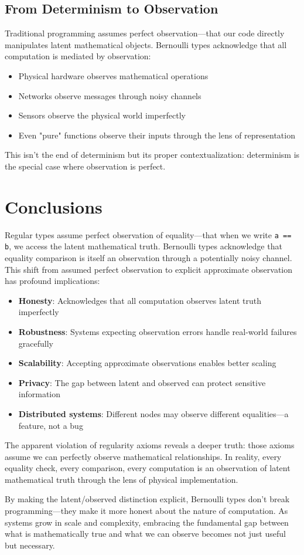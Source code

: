 \documentclass[11pt,final,hidelinks]{article}
\newcommand{\code}[1]{\texttt{#1}}
\begin{document}
\subsection{From Determinism to Observation}

Traditional programming assumes perfect observation—that our code directly manipulates latent mathematical objects. Bernoulli types acknowledge that all computation is mediated by observation:
\begin{itemize}
    \item Physical hardware observes mathematical operations
    \item Networks observe messages through noisy channels  
    \item Sensors observe the physical world imperfectly
    \item Even "pure" functions observe their inputs through the lens of representation
\end{itemize}

This isn't the end of determinism but its proper contextualization: determinism is the special case where observation is perfect.

\section{Conclusions}

Regular types assume perfect observation of equality—that when we write \code{a == b}, we access the latent mathematical truth. Bernoulli types acknowledge that equality comparison is itself an observation through a potentially noisy channel. This shift from assumed perfect observation to explicit approximate observation has profound implications:

\begin{itemize}
    \item \textbf{Honesty}: Acknowledges that all computation observes latent truth imperfectly
    \item \textbf{Robustness}: Systems expecting observation errors handle real-world failures gracefully
    \item \textbf{Scalability}: Accepting approximate observations enables better scaling
    \item \textbf{Privacy}: The gap between latent and observed can protect sensitive information
    \item \textbf{Distributed systems}: Different nodes may observe different equalities—a feature, not a bug
\end{itemize}

The apparent violation of regularity axioms reveals a deeper truth: those axioms assume we can perfectly observe mathematical relationships. In reality, every equality check, every comparison, every computation is an observation of latent mathematical truth through the lens of physical implementation.

By making the latent/observed distinction explicit, Bernoulli types don't break programming—they make it more honest about the nature of computation. As systems grow in scale and complexity, embracing the fundamental gap between what is mathematically true and what we can observe becomes not just useful but necessary.


\end{document}
